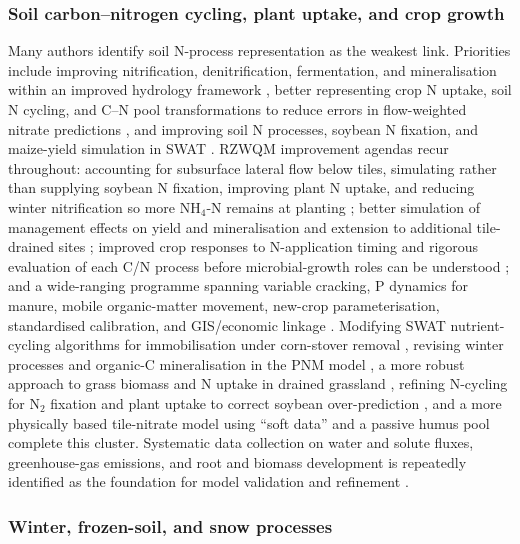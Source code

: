 \documentclass[11pt]{article}
\begin{document}
\subsubsection{Soil carbon--nitrogen cycling, plant uptake, and crop growth}

Many authors identify soil N-process representation as the weakest link. Priorities include improving nitrification, denitrification, fermentation, and mineralisation within an improved hydrology framework \parencite{Smith2020}, better representing crop N uptake, soil N cycling, and C--N pool transformations to reduce errors in flow-weighted nitrate predictions \parencite{Fang2012}, and improving soil N processes, soybean N fixation, and maize-yield simulation in SWAT \parencite{Hu2007}. RZWQM improvement agendas recur throughout: accounting for subsurface lateral flow below tiles, simulating rather than supplying soybean N fixation, improving plant N uptake, and reducing winter nitrification so more NH$_4$-N remains at planting \parencite{Ma2007}; better simulation of management effects on yield and mineralisation and extension to additional tile-drained sites \parencite{Ma2007b}; improved crop responses to N-application timing and rigorous evaluation of each C/N process before microbial-growth roles can be understood \parencite{Ma2008}; and a wide-ranging programme spanning variable cracking, P dynamics for manure, mobile organic-matter movement, new-crop parameterisation, standardised calibration, and GIS/economic linkage \parencite{Ma2001}. Modifying SWAT nutrient-cycling algorithms for immobilisation under corn-stover removal \parencite{Malone2019}, revising winter processes and organic-C mineralisation in the PNM model \parencite{Marjerison2016}, a more robust approach to grass biomass and N uptake in drained grassland \parencite{Bechtold2007}, refining N-cycling for N$_2$ fixation and plant uptake to correct soybean over-prediction \parencite{Bakhsh2004}, and a more physically based tile-nitrate model using ``soft data'' and a passive humus pool \parencite{Qi2025} complete this cluster. Systematic data collection on water and solute fluxes, greenhouse-gas emissions, and root and biomass development is repeatedly identified as the foundation for model validation and refinement \parencite{Ma2025}.

\subsubsection{Winter, frozen-soil, and snow processes}
\end{document}
